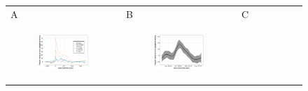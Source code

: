 \documentclass[11pt]{article}
\begin{document}
\begin{figure}[ht]
	\begin{tabular}{lll}
	A&B&C\\
	\begin{subfigure}[t]{0.30\linewidth}
		\centering
		\includegraphics[width=1\linewidth]{figs/figure-1a-hurricane-estimates.pdf} 
	\end{subfigure}&
	\begin{subfigure}[t]{0.30\linewidth}
		\centering
		\includegraphics[width=1\linewidth]{figs/figure-1b-chikungunya-estimate.pdf}
	\end{subfigure}&
	\begin{subfigure}[t]{0.30\linewidth}
		\centering

\end{subfigure}
\end{tabular}
\end{figure}
\end{document}
